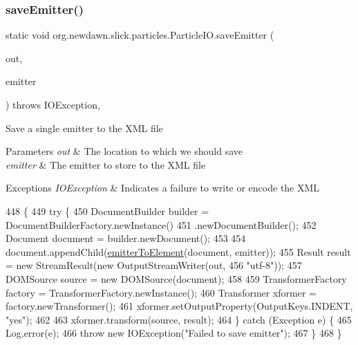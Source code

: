 \subsubsection{\texorpdfstring{save\+Emitter()}{saveEmitter()}\hspace{0.1cm}{\footnotesize\ttfamily [2/2]}}
{\footnotesize\ttfamily static void org.\+newdawn.\+slick.\+particles.\+Particle\+I\+O.\+save\+Emitter (\begin{DoxyParamCaption}\item[{Output\+Stream}]{out,  }\item[{\mbox{\hyperlink{classorg_1_1newdawn_1_1slick_1_1particles_1_1_configurable_emitter}{Configurable\+Emitter}}}]{emitter }\end{DoxyParamCaption}) throws I\+O\+Exception\hspace{0.3cm}{\ttfamily [inline]}, {\ttfamily [static]}}

Save a single emitter to the X\+ML file


\begin{DoxyParams}{Parameters}
{\em out} & The location to which we should save \\
\hline
{\em emitter} & The emitter to store to the X\+ML file \\
\hline
\end{DoxyParams}

\begin{DoxyExceptions}{Exceptions}
{\em I\+O\+Exception} & Indicates a failure to write or encode the X\+ML \\
\hline
\end{DoxyExceptions}

\begin{DoxyCode}
448                                \{
449         \textcolor{keywordflow}{try} \{
450             DocumentBuilder builder = DocumentBuilderFactory.newInstance()
451                     .newDocumentBuilder();
452             Document document = builder.newDocument();
453 
454             document.appendChild(\mbox{\hyperlink{classorg_1_1newdawn_1_1slick_1_1particles_1_1_particle_i_o_af9519582cb522c103cc0a829fb3e8413}{emitterToElement}}(document, emitter));
455             Result result = \textcolor{keyword}{new} StreamResult(\textcolor{keyword}{new} OutputStreamWriter(out,
456                     \textcolor{stringliteral}{"utf-8"}));
457             DOMSource source = \textcolor{keyword}{new} DOMSource(document);
458 
459             TransformerFactory factory = TransformerFactory.newInstance();
460             Transformer xformer = factory.newTransformer();
461             xformer.setOutputProperty(OutputKeys.INDENT, \textcolor{stringliteral}{"yes"});
462 
463             xformer.transform(source, result);
464         \} \textcolor{keywordflow}{catch} (Exception e) \{
465             Log.error(e);
466             \textcolor{keywordflow}{throw} \textcolor{keyword}{new} IOException(\textcolor{stringliteral}{"Failed to save emitter"});
467         \}
468     \}
\end{DoxyCode}

